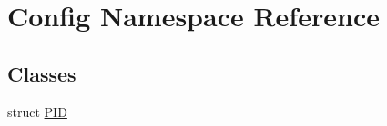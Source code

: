 \hypertarget{namespace_config}{\section{Config Namespace Reference}
\label{namespace_config}
}
\subsection*{Classes}
\begin{DoxyCompactItemize}
\item 
struct \hyperlink{struct_config_1_1_p_i_d}{P\-I\-D}
\end{DoxyCompactItemize}
